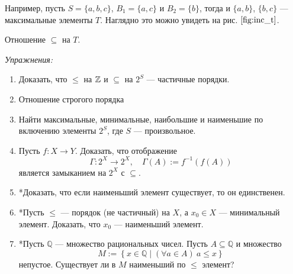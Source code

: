 Например, пусть $S=\{a,b,c\}$, $B_1=\{a,c\}$ и $B_2=\{b\}$, тогда
и $\{a,b\}$, $\{b,c\}$ --- максимальные элементы $T$.
Наглядно это можно увидеть на рис. $\ref{fig:inc_t}$.

\begin{marginfigure}
	\center

	\caption{Отношение $\subseteq$ на $T$.}\label{fig:inc_t}
\end{marginfigure}

\newcommand\Q{\mathbb Q}
\vspace{1em}
{\it Упражнения:}
\begin{enumerate}
	\item{}Доказать, что $\leq$ на $\mathbb Z$ и $\subseteq$ на $2^{S}$ --- частичные порядки.
	\item{}Отношение строгого порядка
	\item{}Найти максимальные, минимальные, наибольшие и
		наименьшие по включению элементы $2^{S}$, где $S$ --- произвольное.
	\item{}Пусть $f:X\to Y$. Доказать, что отображение
		\[
			\Gamma:2^{X}\to 2^{X},\quad \Gamma(A):= f^{-1}(f(A))
		\]
		является замыканием на $2^{X}$ с $\subseteq$.
	\item{}*Доказать, что если наименьший элемент существует, то
		он единственен.
	\item{}*Пусть $\leq$ --- порядок (не частичный) на $X$, а $x_0\in X$ --- минимальный
		элемент. Доказать, что $x_0$ --- наименьший элемент.
	\item{}*Пусть $\Q$ --- множество рациональных чисел.
		Пусть $A\subseteq \Q$ и множество
		\[
			M:=\left\{x\in \Q\;\big|\;(\forall a\in A)~a\leq x\right\}
		\]
		непустое. Существует ли в $M$ наименьший по $\leq$ элемент?
\end{enumerate}
